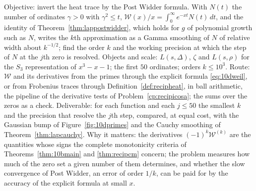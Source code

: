 \begin{compproblem}\label{cp:lappw}
Objective: invert the heat trace by the Post Widder formula. With $N(t)$ the number of ordinates $\gamma>0$ with $\gamma^2\le t$, $\mathcal W(x)/x=\int_0^\infty e^{-xt}N(t)\,dt$, and the identity of Theorem~\ref{thm:lappostwidder}, which holds for $g$ of polynomial growth such as $N$, writes the $k$th approximation as a Gamma smoothing of $N$ of relative width about $k^{-1/2}$; find the order $k$ and the working precision at which the step of $N$ at the $j$th zero is resolved. Objects and scale: $L(s,\Delta)$, $\zeta$ and $L(s,\rho)$ for the $S_3$ representation of $x^3-x-1$; the first $50$ ordinates; orders $k\le10^3$. Route: $\mathcal W$ and its derivatives from the primes through the explicit formula \eqref{eq:10dweil}, or from Frobenius traces through Definition~\ref{def:recipheat}, in ball arithmetic, the pipeline of the derivative tests of Problem~\ref{cp:recipicosa}; the sums over the zeros as a check. Deliverable: for each function and each $j\le50$ the smallest $k$ and the precision that resolve the $j$th step, compared, at equal cost, with the Gaussian bump of Figure~\ref{fig:10dprimes} and the Cauchy smoothing of Theorem~\ref{thm:lapcauchy}. Why it matters: the derivatives $(-1)^k\mathcal W^{(k)}$ are the quantities whose signs the complete monotonicity criteria of Theorems~\ref{thm:10bmain} and \ref{thm:recipcm} concern; the problem measures how much of the zero set a given number of them determines, and whether the slow convergence of Post Widder, an error of order $1/k$, can be paid for by the accuracy of the explicit formula at small $x$.
\end{compproblem}

